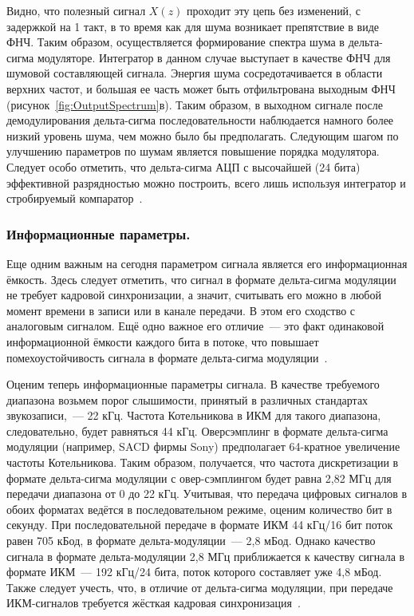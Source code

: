 Видно, что полезный сигнал $X(z)$ проходит эту цепь без изменений, с задержкой на 1 такт, в то время как для шума возникает препятствие в виде ФНЧ. Таким образом, осуществляется формирование спектра шума в дельта-сигма модуляторе. Интегратор в данном случае выступает в качестве ФНЧ для шумовой составляющей сигнала. Энергия шума сосредотачивается в области верхних частот, и большая ее часть может быть отфильтрована выходным ФНЧ (рисунок~\ref{fig:OutputSpectrum}в). Таким образом, в выходном сигнале после демодулирования дельта-сигма последовательности наблюдается намного более низкий уровень шума, чем можно было бы предполагать. Следующим шагом по улучшению параметров по шумам является повышение порядка модулятора. Следует особо отметить, что дельта-сигма АЦП с высочайшей (24 бита) эффективной разрядностью можно построить, всего лишь используя интегратор и стробируемый компаратор~\cite{KitE_DeltaSigma}.

\subsubsection{Информационные параметры. }
Еще одним важным на сегодня параметром сигнала является его информационная ёмкость. Здесь следует отметить, что сигнал в формате дельта-сигма модуляции не требует кадровой синхронизации, а значит, считывать его можно в любой момент времени в записи или в канале передачи. В этом его сходство с аналоговым сигналом. Ещё одно важное его отличие~--- это факт одинаковой информационной ёмкости каждого бита в потоке, что повышает помехоустойчивость сигнала в формате дельта-сигма модуляции~\cite{KitE_DeltaSigma}.

Оценим теперь информационные параметры сигнала. В качестве требуемого диапазона возьмем порог слышимости, принятый в различных стандартах звукозаписи,~--- 22 кГц. Частота Котельникова в ИКМ для такого диапазона, следовательно, будет равняться 44 кГц. Оверсэмплинг в формате дельта-сигма модуляции (например, SACD фирмы Sony) предполагает 64-кратное увеличение частоты Котельникова. Таким образом, получается, что частота дискретизации в формате дельта-сигма модуляции с овер-сэмплингом будет равна 2,82 МГц для передачи диапазона от 0 до 22 кГц. Учитывая, что передача цифровых сигналов в обоих форматах ведётся в последовательном режиме, оценим количество бит в секунду. При последовательной передаче в формате ИКМ 44 кГц/16 бит поток равен 705 кБод, в формате дельта-модуляции~--- 2,8 мБод. Однако качество сигнала в формате дельта-модуляции 2,8 МГц приближается к качеству сигнала в формате ИКМ~--- 192 кГц/24 бита, поток которого составляет уже 4,8 мБод. Также следует учесть, что, в отличие от дельта-сигма модуляции, при передаче ИКМ-сигналов требуется жёсткая кадровая синхронизация~\cite{KitE_DeltaSigma}.

